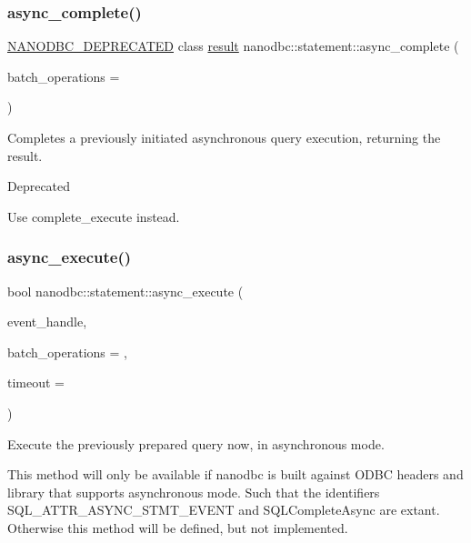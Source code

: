 \subsubsection{\texorpdfstring{async\_complete()}{async\_complete()}}
{\footnotesize\ttfamily \mbox{\hyperlink{nanodbc_8hpp_a19335d16a1c69aa9d7b948100c4847ab}{N\+A\+N\+O\+D\+B\+C\+\_\+\+D\+E\+P\+R\+E\+C\+A\+T\+ED}} class \mbox{\hyperlink{classnanodbc_1_1result}{result}} nanodbc\+::statement\+::async\+\_\+complete (\begin{DoxyParamCaption}\item[{long}]{batch\+\_\+operations = {} }\end{DoxyParamCaption})}



Completes a previously initiated asynchronous query execution, returning the result. 

\begin{DoxyRefDesc}{Deprecated}
\item[\mbox{\hyperlink{deprecated__deprecated000001}{Deprecated}}]Use complete\+\_\+execute instead. \end{DoxyRefDesc}
\mbox{\label{classnanodbc_1_1statement_ac7086dafc8c0f014c629d15f97cc9505}} 
\subsubsection{\texorpdfstring{async\_execute()}{async\_execute()}}
{\footnotesize\ttfamily bool nanodbc\+::statement\+::async\+\_\+execute (\begin{DoxyParamCaption}\item[{void $\ast$}]{event\+\_\+handle,  }\item[{long}]{batch\+\_\+operations = {},  }\item[{long}]{timeout = {} }\end{DoxyParamCaption})}



Execute the previously prepared query now, in asynchronous mode. 

This method will only be available if nanodbc is built against O\+D\+BC headers and library that supports asynchronous mode. Such that the identifiers {\ttfamily S\+Q\+L\+\_\+\+A\+T\+T\+R\+\_\+\+A\+S\+Y\+N\+C\+\_\+\+S\+T\+M\+T\+\_\+\+E\+V\+E\+NT} and {\ttfamily S\+Q\+L\+Complete\+Async} are extant. Otherwise this method will be defined, but not implemented.

